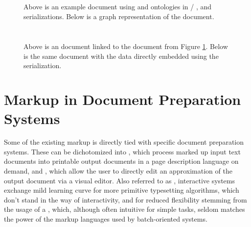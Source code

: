 \documentclass{book}
\begin{document}
\begin{figure}
  \inputminted{xml}{examples/02/john.rd}
  \inputminted{text}{examples/02/john.nt}
  \inputminted{text}{examples/02/john.ttl}
  \caption{Above is an example  document using  and
     ontologies in /%
    ,  and %
     serializations. Below is a graph representation of the
    document.}\label{fig:rdf-doc}\bigskip
  
\end{figure}

\begin{figure}[t!]
  \inputminted{html}{examples/02/john.html.linked-rdf}
  \caption{Above is an  document linked to the 
    document from Figure \ref{fig:rdf-doc}. Below is the same 
    document with the  data directly embedded using the
     serialization.}\bigskip
  \inputminted{html}{examples/02/john.html.rdfa}
\end{figure}

        
\section{Markup in Document Preparation Systems}
Some of the existing markup is directly tied with specific document preparation
systems. These can be dichotomized into 
, which process marked up input
text documents into printable output documents in a page description language on
demand, and  , which allow the user to directly edit an approximation of
the output document via a visual editor. Also referred to as ,
interactive systems exchange mild learning curve for more primitive typesetting
algorithms, which don't stand in the way of interactivity, and for reduced
flexibility stemming from the usage of a , which, although often
intuitive for simple tasks, seldom matches the power of the markup languages
used by batch-oriented systems.
\end{document}
